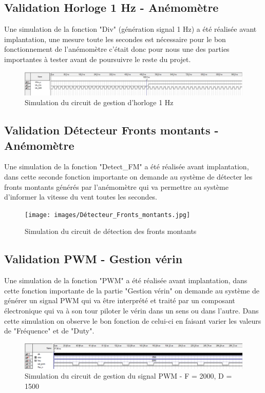  \subsection{Validation Horloge 1 Hz - Anémomètre}

Une simulation de la fonction "Div" (génération signal 1 Hz) a été réalisée avant implantation, une mesure toute les secondes est nécessaire pour le bon fonctionnement de l'anémomètre c'était donc pour nous une des parties importantes à tester avant de poursuivre le reste du projet.

\begin{figure}[h]
  \begin{center}
    \includegraphics[width=\textwidth]{images/Clk_1Hz.jpg}
    \caption{Simulation du circuit de gestion d'horloge 1 Hz}
  \end{center}
\end{figure}

\subsection{Validation Détecteur Fronts montants - Anémomètre}

Une simulation de la fonction "Detect\_FM" a été réalisée avant implantation, dans cette seconde fonction importante on demande au système de détecter les fronts montants générés par l'anémomètre qui va permettre au système d'informer la vitesse du vent toutes les secondes.

\begin{figure}[h]
  \begin{center}
    \texttt{[image: images/Détecteur\_Fronts\_montants.jpg]}
    \caption{Simulation du circuit de détection des fronts montants}
  \end{center}
\end{figure}

\subsection{Validation PWM - Gestion vérin}

Une simulation de la fonction "PWM" a été réalisée avant implantation, dans cette fonction importante de la partie "Gestion vérin" on demande au système de générer un signal PWM qui va être interprété et traité par un composant électronique qui va à son tour piloter le vérin dans un sens ou dans l'autre. Dans cette simulation on observe le bon fonction de celui-ci en faisant varier les valeurs de "Fréquence" et de "Duty".

\begin{figure}[h]
  \begin{center}
    \includegraphics[width=\textwidth]{images/pwm.png}
    \caption{Simulation du circuit de gestion du signal PWM - F = 2000, D = 1500}
  \end{center}
\end{figure}